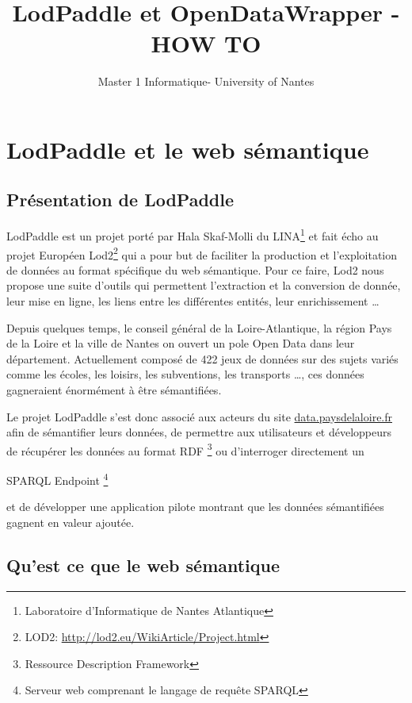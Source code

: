 \documentclass[a4paper]{article}
\title{LodPaddle et OpenDataWrapper - HOW TO}
\author{Master 1 Informatique- University of Nantes}
\begin{document}
\maketitle
\newpage

\tableofcontents %
\newpage

\section{LodPaddle et le web sémantique}
\subsection{Présentation de LodPaddle}

LodPaddle est un projet porté par Hala Skaf-Molli du LINA\footnote{Laboratoire
d'Informatique de Nantes Atlantique} et fait écho au projet Européen
Lod2\footnote{LOD2:
\href{http://lod2.eu/WikiArticle/Project.html}{http://lod2.eu/WikiArticle/Project.html}}
qui a pour but de faciliter la production et l'exploitation de données au format
spécifique du web sémantique. Pour ce faire, Lod2 nous propose une suite
d'outils qui permettent l'extraction et la conversion de donnée, leur mise en
ligne, les liens entre les différentes entités, leur enrichissement \ldots{}

Depuis quelques temps, le conseil général de la Loire-Atlantique, la région Pays
de la Loire et la ville de Nantes on ouvert un pole Open Data dans leur
département. Actuellement composé de 422 jeux de données sur des sujets variés
comme les écoles, les loisirs, les subventions, les transports \ldots{}, ces
données gagneraient énormément à être sémantifiées.

Le projet LodPaddle s'est donc associé aux acteurs du site
\href{http://data.paysdelaloire.fr}{data.paysdelaloire.fr} afin de sémantifier
leurs données, de permettre aux utilisateurs et développeurs de récupérer les
données au format RDF \footnote{Ressource Description Framework} ou d'interroger
directement un \begin{itshape}SPARQL Endpoint \footnote{Serveur web comprenant
le langage de requête SPARQL}\end{itshape} et de développer une application
pilote montrant que les données sémantifiées gagnent en valeur ajoutée.

\subsection{Qu'est ce que le web sémantique}
\end{document}
